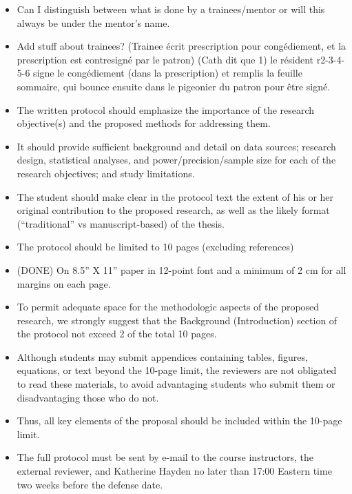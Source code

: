 
\begin{itemize}
    \item Can I distinguish between what is done by a trainees/mentor or will this always be under the mentor's name.
    \item Add stuff about trainees? (Trainee écrit prescription pour congédiement, et la prescription est contresigné par le patron) (Cath dit que 1) le résident r2-3-4-5-6 signe le congédiement (dans la prescription) et remplis la feuille sommaire, qui bounce ensuite dans le pigeonier du patron pour être signé.
\end{itemize}

\begin{itemize}
    \item The written protocol should emphasize the importance of the research objective(s) and the proposed methods for addressing them.
    \item It should provide sufficient background and detail on data sources; research design, statistical analyses, and power/precision/sample size for each of the research objectives; and study limitations.
    \item The student should make clear in the protocol text the extent of his or her original contribution to the proposed research, as well as the likely format (“traditional” vs manuscript-based) of the thesis.
    \item The protocol should be limited to 10 pages (excluding references)
    \item (DONE) On 8.5” X 11” paper in 12-point font and a minimum of 2 cm for all margins on each page.
    \item To permit adequate space for the methodologic aspects of the proposed research, we strongly suggest that the Background (Introduction) section of the protocol not exceed 2 of the total 10 pages.
    \item Although students may submit appendices containing tables, figures, equations, or text beyond the 10-page limit, the reviewers are not obligated to read these materials, to avoid advantaging students who submit them or disadvantaging those who do not.
    \item Thus, all key elements of the proposal should be included within the 10-page limit.
    \item The full protocol must be sent by e-mail to the course instructors, the external reviewer, and Katherine Hayden no later than 17:00 Eastern time two weeks before the defense date.
\end{itemize}